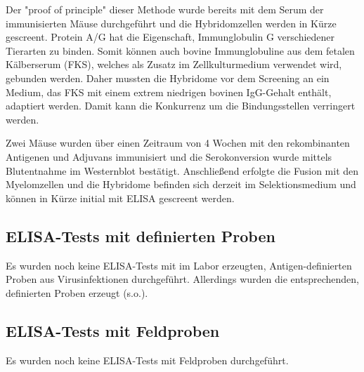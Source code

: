 Der "proof of principle" dieser Methode wurde bereits mit dem Serum der immunisierten Mäuse durchgeführt und die Hybridomzellen werden in Kürze gescreent. Protein A/G hat die Eigenschaft, Immunglobulin G verschiedener Tierarten zu binden. Somit können auch bovine Immunglobuline aus dem fetalen Kälberserum (FKS), welches als Zusatz im Zellkulturmedium verwendet wird, gebunden werden. Daher mussten die Hybridome vor dem Screening an ein Medium, das FKS mit einem extrem niedrigen bovinen IgG-Gehalt enthält, adaptiert werden. Damit kann die Konkurrenz um die Bindungsstellen verringert werden.


Zwei Mäuse wurden über einen Zeitraum von 4 Wochen mit den rekombinanten Antigenen und Adjuvans immunisiert und die Serokonversion wurde mittels Blutentnahme im Westernblot bestätigt. Anschließend erfolgte die Fusion mit den Myelomzellen und die Hybridome befinden sich derzeit im Selektionsmedium und können in Kürze initial mit ELISA gescreent werden.

\subsection{ELISA-Tests mit definierten Proben}
Es wurden noch keine ELISA-Tests mit im Labor erzeugten, Antigen-definierten Proben aus Virusinfektionen durchgeführt. Allerdings wurden die entsprechenden, definierten Proben erzeugt (s.o.).

\subsection{ELISA-Tests mit Feldproben}
Es wurden noch keine ELISA-Tests mit Feldproben durchgeführt.

















